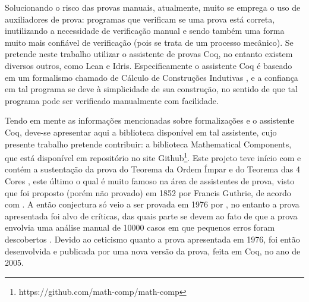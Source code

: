 Solucionando o risco das provas manuais, atualmente, muito se emprega o uso de auxiliadores de prova: programas que verificam se uma prova está correta, inutilizando a necessidade de verificação manual e sendo também uma forma muito mais confiável de verificação (pois se trata de um processo mecânico). Se pretende neste trabalho utilizar o assistente de provas Coq, no entanto existem diversos outros, como Lean e Idris. Especificamente o assistente Coq é baseado em um formalismo chamado de Cálculo de Construções Indutivas \cite{paulinmohring:hal-01094195}, e a confiança em tal programa se deve à simplicidade de sua construção, no sentido de que tal programa pode ser verificado manualmente com facilidade.

Tendo em mente as informações mencionadas sobre formalizações e o assistente Coq, deve-se apresentar aqui a biblioteca disponível em tal assistente, cujo presente trabalho pretende contribuir: a biblioteca Mathematical Components, que está disponível em repositório no site Github\footnote{https://github.com/math-comp/math-comp}. Este projeto teve início com e contém a sustentação da prova do Teorema da Ordem Ímpar e do Teorema das 4 Cores \cite{assia_mahboubi_2022_7118596}, este último o qual é muito famoso na área de assistentes de prova, visto que foi proposto (porém não provado) em 1852 por Francis Guthrie, de acordo com \cite{gonthier:hal-04034866}. A então conjectura só veio a ser provada em 1976 por \cite{bams/1183538218}, no entanto a prova apresentada foi alvo de críticas, das quais parte se devem ao fato de que a prova envolvia uma análise manual de 10000 casos em que pequenos erros foram descobertos \cite{gonthier:hal-04034866}. Devido ao ceticismo quanto a prova apresentada em 1976, foi então desenvolvida e publicada por \cite{gonthier:hal-04034866} uma nova versão da prova, feita em Coq, no ano de 2005.

